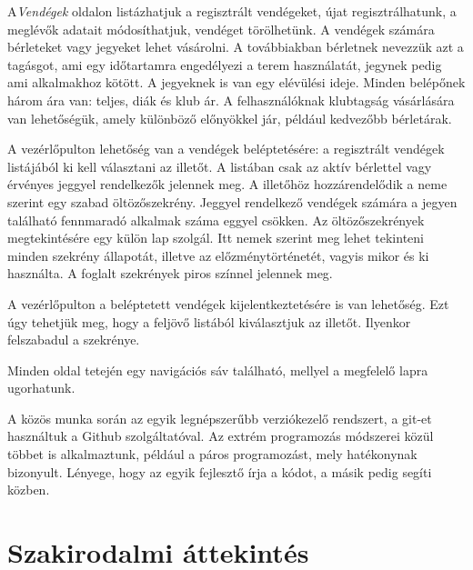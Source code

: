 \documentclass[12pt]{article}
\begin{document}
A\textit{Vendégek} oldalon listázhatjuk a regisztrált vendégeket, újat regisztrálhatunk, a meglévők adatait módosíthatjuk, vendéget törölhetünk. A vendégek számára bérleteket vagy jegyeket lehet vásárolni. A továbbiakban bérletnek nevezzük azt a tagásgot, ami egy időtartamra engedélyezi a terem használatát, jegynek pedig ami alkalmakhoz kötött. A jegyeknek is van egy elévülési ideje. Minden belépőnek három ára van: teljes, diák és klub ár. A felhasználóknak klubtagság vásárlására van lehetőségük, amely különböző előnyökkel jár, például kedvezőbb bérletárak.

A vezérlőpulton lehetőség van a vendégek beléptetésére: a regisztrált vendégek listájából ki kell választani az illetőt. A listában csak az aktív bérlettel vagy érvényes jeggyel rendelkezők jelennek meg. A illetőhöz hozzárendelődik a neme szerint egy szabad öltözőszekrény. Jeggyel rendelkező vendégek számára a jegyen található fennmaradó alkalmak száma eggyel csökken. Az öltözőszekrények megtekintésére egy külön lap szolgál. Itt nemek szerint meg lehet tekinteni minden szekrény állapotát, illetve az előzménytörténetét, vagyis mikor és ki használta. A foglalt szekrények piros színnel jelennek meg.

A vezérlőpulton  a beléptetett vendégek kijelentkeztetésére is van lehetőség. Ezt úgy tehetjük meg, hogy a feljövő listából kiválasztjuk az illetőt. Ilyenkor felszabadul a szekrénye. 

Minden oldal tetején egy navigációs sáv található, mellyel a megfelelő lapra ugorhatunk.

A közös munka során az egyik legnépszerűbb verziókezelő rendszert, a git-et használtuk a Github szolgáltatóval. Az extrém programozás módszerei közül többet is alkalmaztunk, például a páros programozást, mely hatékonynak bizonyult. Lényege, hogy az egyik fejlesztő írja a kódot, a másik pedig segíti közben.

\newpage
\section{Szakirodalmi áttekintés}
\end{document}
